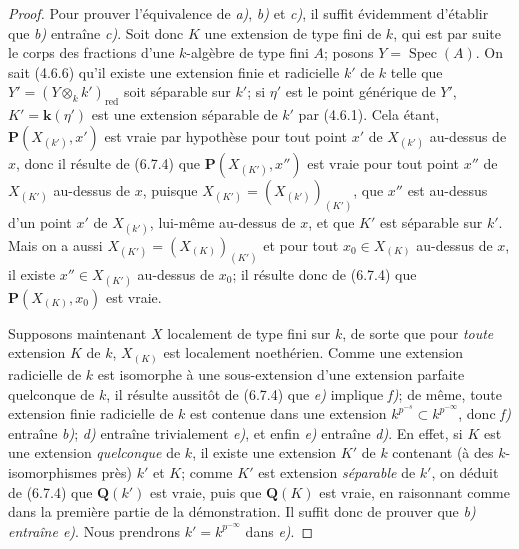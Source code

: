 \begin{proof}
Pour prouver l'équivalence de \emph{a)}, \emph{b)} et \emph{c)}, il suffit évidemment d'établir
que \emph{b)} entraîne \emph{c)}. Soit donc $K$ une extension de type fini de $k$, qui est
par suite le corps des fractions d'une $k$-algèbre de type fini $A$; posons
$Y=\operatorname{Spec}(A)$. On sait (4.6.6) qu'il existe une extension finie
et radicielle $k'$ de $k$ telle que $Y'=(Y\otimes_k k')_{\mathrm{red}}$ soit
séparable sur $k'$; si $\eta'$ est le point générique de $Y'$, $K'=\boldsymbol{k}(\eta')$
est une extension séparable de $k'$ par (4.6.1). Cela étant,
$\boldsymbol{P}(X_{(k')},x')$ est vraie par hypothèse pour tout point $x'$ de $X_{(k')}$
au-dessus de $x$, donc il résulte de (6.7.4) que $\boldsymbol{P}(X_{(K')},x'')$ est vraie
pour tout point $x''$ de $X_{(K')}$ au-dessus de $x$, puisque
$X_{(K')}=(X_{(k')})_{(K')}$, que $x''$ est au-dessus d'un point $x'$ de
$X_{(k')}$, lui-même au-dessus de $x$, et que $K'$ est séparable sur $k'$.
Mais on a aussi
$X_{(K')}=(X_{(K)})_{(K')}$ et pour tout $x_0\in X_{(K)}$ au-dessus de
$x$, il existe $x''\in X_{(K')}$ au-dessus de $x_0$; il résulte donc de
(6.7.4) que $\boldsymbol{P}(X_{(K)},x_0)$ est vraie.

Supposons maintenant $X$ localement de type fini sur $k$, de sorte que pour
\emph{toute} extension $K$ de $k$, $X_{(K)}$ est localement noethérien. Comme une
extension radicielle de $k$ est isomorphe à une sous-extension d'une extension
parfaite quelconque de $k$, il résulte aussitôt de (6.7.4) que \emph{e)} implique \emph{f)};
de même, toute extension finie radicielle de $k$ est contenue dans une
extension $k^{p^{-s}}\subset k^{p^{-\infty}}$, donc \emph{f)} entraîne \emph{b)}; \emph{d)} entraîne
trivialement \emph{e)}, et enfin \emph{e)} entraîne \emph{d)}. En effet, si $K$ est une extension
\emph{quelconque} de $k$,
il existe une extension $K'$ de $k$ contenant (à des $k$-isomorphismes près)
$k'$ et $K$; comme $K'$ est extension \emph{séparable} de $k'$, on déduit de (6.7.4)
que $\boldsymbol{Q}(k')$ est vraie, puis que $\boldsymbol{Q}(K)$ est vraie, en raisonnant comme dans la
première partie de la démonstration. Il suffit donc de prouver que \emph{b) entraîne
e)}. Nous prendrons $k'=k^{p^{-\infty}}$ dans \emph{e)}.


\end{proof}
